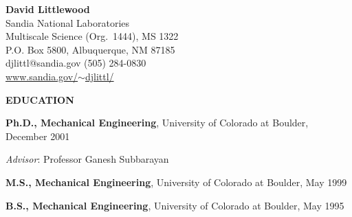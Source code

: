 \documentclass[11pt]{article}
\newlength{\itemskip} \setlength{\itemskip}{0.0in}
\newlength{\sectionskip} \setlength{\sectionskip}{0.2in}
\newlength{\listskip} \setlength{\listskip}{0.05in}
\newlength{\minipagewidth} \setlength{\minipagewidth}{6.25in} %
\begin{document}
\thispagestyle{empty}

\begin{center}
{\LARGE \textbf{David Littlewood}} \\
\vspace{0.1in}
%
Sandia National Laboratories \\
Multiscale Science (Org.~1444), MS 1322 \\
P.O. Box 5800, Albuquerque, NM 87185 \\
djlittl@sandia.gov \hspace{.1in} (505) 284-0830 \\
\href{http://www.sandia.gov/~djlittl/}{www.sandia.gov/$\sim$djlittl/} \\
%
\end{center}

\noindent
{\large \textbf{EDUCATION}}
\vspace{\sectionskip}

\begin{minipage}{\minipagewidth}
\textbf{Ph.D., Mechanical Engineering}, University of Colorado at Boulder, December 2001 %

\vspace{\listskip}
{\it Advisor}: Professor Ganesh Subbarayan
\end{minipage}\vspace{\parskip}

\begin{minipage}{\minipagewidth}
\textbf{M.S., Mechanical Engineering}, University of Colorado at Boulder, May 1999 %
\end{minipage}\vspace{\itemskip}

\begin{minipage}{\minipagewidth}
\textbf{B.S., Mechanical Engineering}, University of Colorado at Boulder, May 1995 %
\end{minipage}
\end{document}
